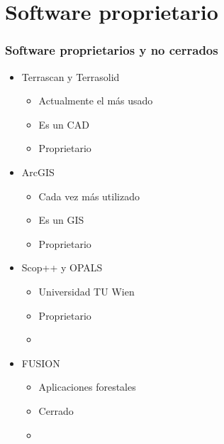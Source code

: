 \section{Software proprietario}
\begin{frame}
  \frametitle{Software proprietarios y no cerrados}
  \begin{itemize}
    \item Terrascan y Terrasolid
      \begin{itemize}
       \item Actualmente el más usado
       \item Es un CAD
       \item Proprietario
      \end{itemize}
    \item ArcGIS
      \begin{itemize}
        \item Cada vez más utilizado
        \item Es un GIS
       \item Proprietario
      \end{itemize}
    \item Scop++ y OPALS 
    \begin{itemize}
      \item Universidad TU Wien
      \item Proprietario
      \item {}
    \end{itemize}
    \item FUSION 
    \begin{itemize}
      \item Aplicaciones forestales
      \item Cerrado
      \item {}
    \end{itemize}
  \end{itemize}
\end{frame}
